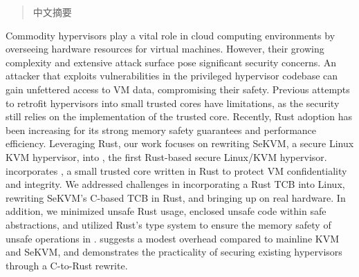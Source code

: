 
\begin{abstract}

中文摘要

\end{abstract}

\begin{abstract*}

Commodity hypervisors play a vital role in cloud computing environments by
overseeing hardware resources for virtual machines. However, their growing
complexity and extensive attack surface pose significant security concerns.
An attacker that exploits vulnerabilities in the privileged hypervisor
codebase can gain unfettered access to VM data, compromising their safety.
Previous attempts to retrofit hypervisors into small trusted cores have
limitations, as the security still relies on the implementation of the trusted
core. Recently, Rust adoption has been increasing for its strong memory safety
guarantees and performance efficiency. Leveraging Rust, our work focuses on
rewriting SeKVM, a secure Linux KVM hypervisor, into \rustsec{}, the first
Rust-based secure Linux/KVM hypervisor. \rustsec{} incorporates
\rustcore{}, a small trusted core written in Rust to protect VM confidentiality
and integrity.
We addressed challenges in incorporating a Rust TCB into Linux, rewriting SeKVM's
C-based TCB in Rust, and bringing up \rustsec{} on real hardware. In addition,
we minimized unsafe Rust usage, enclosed unsafe code within safe abstractions,
and utilized Rust's type system to ensure the memory safety of unsafe
operations in \rustcore{}.
\rustsec{} suggests a modest overhead compared to mainline KVM and SeKVM, and
demonstrates the practicality of securing existing hypervisors through a
C-to-Rust rewrite.

\end{abstract*}
